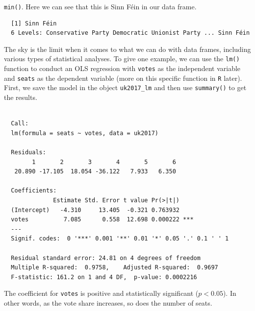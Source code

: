 \documentclass[12pt,oneside]{reedthesis}
\theoremstyle{definition}
\theoremstyle{definition}
\theoremstyle{definition}
\theoremstyle{remark}
\begin{document}
  \texttt{min()}. Here we can see that this is Sinn Féin in our data
  frame.
  \begin{Shaded}
  \begin{Highlighting}[]
  \OperatorTok{$}\NormalTok{party[uk2017}\OperatorTok{$}\OperatorTok{==}\StringTok{ }\OperatorTok{$}\NormalTok{votes)]}
  \end{Highlighting}
  \end{Shaded}
  \begin{verbatim}
  [1] Sinn Féin
  6 Levels: Conservative Party Democratic Unionist Party ... Sinn Féin
  \end{verbatim}
  The sky is the limit when it comes to what we can do with data frames,
  including various types of statistical analyses. To give one example, we
  can use the \texttt{lm()} function to conduct an OLS regression with
  \texttt{votes} as the independent variable and \texttt{seats} as the
  dependent variable (more on this specific function in \texttt{R} later).
  First, we save the model in the object \texttt{uk2017\_lm} and then use
  \texttt{summary()} to get the results.
  \begin{Shaded}
  \begin{Highlighting}[]
  \StringTok{ }\OperatorTok{~}\StringTok{ }
  
  \end{Highlighting}
  \end{Shaded}
  \begin{verbatim}
  
  Call:
  lm(formula = seats ~ votes, data = uk2017)
  
  Residuals:
        1       2       3       4       5       6 
   20.890 -17.105  18.054 -36.122   7.933   6.350 
  
  Coefficients:
              Estimate Std. Error t value Pr(>|t|)    
  (Intercept)   -4.310     13.405  -0.321 0.763932    
  votes          7.085      0.558  12.698 0.000222 ***
  ---
  Signif. codes:  0 '***' 0.001 '**' 0.01 '*' 0.05 '.' 0.1 ' ' 1
  
  Residual standard error: 24.81 on 4 degrees of freedom
  Multiple R-squared:  0.9758,    Adjusted R-squared:  0.9697 
  F-statistic: 161.2 on 1 and 4 DF,  p-value: 0.0002216
  \end{verbatim}
  The coefficient for \texttt{votes} is positive and statistically
  significant (\(p<0.05\)). In other words, as the vote share increases,
  so does the number of seats.
  
\end{document}
